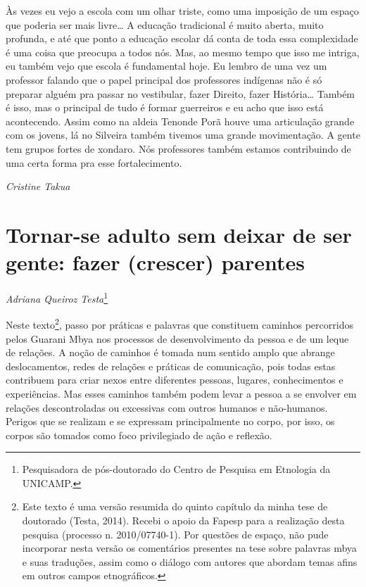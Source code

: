Às vezes eu vejo a escola com um olhar triste, como uma imposição de um
espaço que poderia ser mais livre\ldots{} A educação tradicional é muito
aberta, muito profunda, e até que ponto a educação escolar dá conta de
toda essa complexidade é uma coisa que preocupa a todos nós. Mas, ao
mesmo tempo que isso me intriga, eu também vejo que escola é
fundamental hoje. Eu lembro de uma vez um professor falando que o papel
principal dos professores indígenas não é só preparar alguém pra passar
no vestibular, fazer Direito, fazer História\ldots{} Também é isso, mas o
principal de tudo é formar guerreiros e eu acho que isso está
acontecendo. Assim como na aldeia Tenonde Porã houve uma articulação
grande com os jovens, lá no Silveira também tivemos uma grande
movimentação. A gente tem grupos fortes de xondaro. Nós professores
também estamos contribuindo de uma certa forma pra esse fortalecimento.
\medskip
\begin{flushright}
\emph{Cristine Takua}
\end{flushright}

\chapter{Tornar-se adulto sem deixar de ser gente: fazer (crescer)
parentes}
\begin{flushright}
\emph{Adriana Queiroz Testa}\footnote{Pesquisadora de pós-doutorado do Centro
de Pesquisa em Etnologia da UNICAMP.}
\end{flushright}

Neste texto\footnote{Este texto é uma versão resumida do quinto capítulo
da minha tese de doutorado (Testa, 2014). Recebi o apoio da Fapesp para
a realização desta pesquisa (processo n. 2010/07740-1). Por questões de
espaço, não pude incorporar nesta versão os comentários presentes na
tese sobre palavras mbya e suas traduções, assim como o diálogo com
autores que abordam temas afins em outros campos etnográficos.}, passo
por práticas e palavras que constituem caminhos percorridos pelos
Guarani Mbya nos processos de desenvolvimento da pessoa e de um leque
de relações. A noção de caminhos é tomada num sentido amplo que abrange
deslocamentos, redes de relações e práticas de comunicação, pois todas
estas contribuem para criar nexos entre diferentes pessoas, lugares,
conhecimentos e experiências. Mas esses caminhos também podem levar a
pessoa a se envolver em relações descontroladas ou excessivas com
outros humanos e não-humanos. Perigos que se realizam e se expressam
principalmente no corpo, por isso, os corpos são tomados como foco
privilegiado de ação e reflexão.

